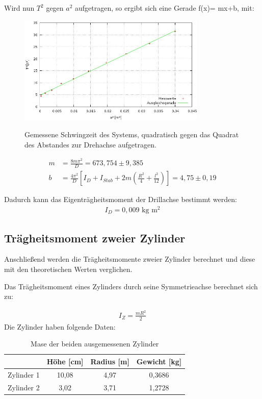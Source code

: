 Wird nun $T^2$ gegen $a^2$ aufgetragen, so ergibt sich eine Gerade f(x)= mx+b, mit:
\begin{figure}[htbp]
\includegraphics[width=0.8\textwidth]{pics/eigentr.jpg}
\label{pic_plot}
\caption{Gemessene Schwingzeit des Systems, quadratisch gegen das Quadrat des Abstandes zur Drehachse aufgetragen.}

\end{figure}
\begin{align*}
 m&=\frac{8m\pi^2}{D}=673,754 \pm 9,385\\
b&=\frac{4\pi^2}{D}  \left[  I_D+I_{Stab}+2m\left(\frac{R^2}{4}+\frac{l^2}{12}\right)\right]=4,75 \pm 0,19
\end{align*}

Dadurch kann das Eigenträgheitsmoment der Drillachse bestimmt werden:
\begin{align*}
I_D=0,009 \text{ kg m$^2$}
\end{align*}

\subsection{Trägheitsmoment zweier Zylinder}
Anschließend werden die Trägheitsmomente zweier Zylinder berechnet und diese mit den theoretischen Werten verglichen.

Das Trägheitsmoment eines Zylinders durch seine Symmetrieachse berechnet sich zu:

\begin{align}
I_{Z}=\frac{mR^2}{2}
\label{eq_Izyl}
\end{align}
\newpage
Die Zylinder haben folgende Daten:
\begin{table}[H]
\begin{tabular}{|c|c|c|c|}
\hline 
 & Höhe [cm] & Radius [m] & Gewicht [kg]\\ 
\hline 
Zylinder 1 & 10,08 & 4,97 & 0,3686 \\ 
\hline 
Zylinder 2 & 3,02 & 3,71 & 1,2728 \\ 
\hline 
\end{tabular} 
\caption{Mase der beiden ausgemessenen Zylinder}
\end{table}

